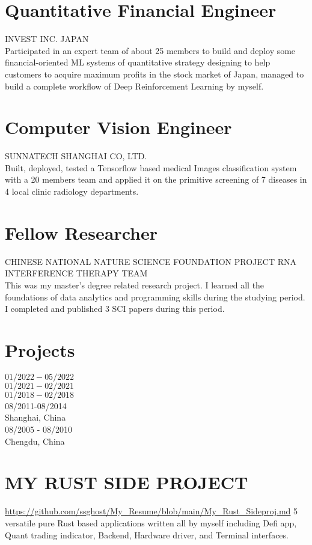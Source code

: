 \documentclass[10pt]{article}
\begin{document}
\section*{Quantitative Financial Engineer}
INVEST INC. JAPAN\\
Participated in an expert team of about 25 members to build and deploy some financial-oriented ML systems of quantitative strategy designing to help customers to acquire maximum profits in the stock market of Japan, managed to build a complete workflow of Deep Reinforcement Learning by myself.

\section*{Computer Vision Engineer}
SUNNATECH SHANGHAI CO, LTD.\\
Built, deployed, tested a Tensorflow based medical Images classification system with a 20 members team and applied it on the primitive screening of 7 diseases in 4 local clinic radiology departments.

\section*{Fellow Researcher}
CHINESE NATIONAL NATURE SCIENCE FOUNDATION PROJECT RNA INTERFERENCE THERAPY TEAM\\
This was my master's degree related research project. I learned all the foundations of data analytics and programming skills during the studying period. I completed and published 3 SCI papers during this period.

\section*{Projects}
$01 / 2022-05 / 2022$\\
$01 / 2021-02 / 2021$\\
$01 / 2018-02 / 2018$\\
08/2011-08/2014\\
Shanghai, China\\
08/2005 - 08/2010\\
Chengdu, China

\section*{MY RUST SIDE PROJECT}
\href{https://github.com/ssghost/My_Resume/blob/main/My_Rust_Sideproj.md}{https://github.com/ssghost/My\_Resume/blob/main/My\_Rust\_Sideproj.md} 5 versatile pure Rust based applications written all by myself including Defi app, Quant trading indicator, Backend, Hardware driver, and Terminal interfaces.
\end{document}
